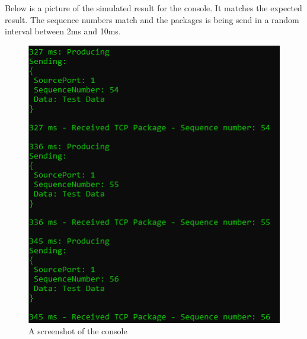 Below is a picture of the simulated result for the console. 
It matches the expected result. The sequence numbers match and the packages is being send in a random interval between 2ms and 10ms. 


\begin{figure}[H]
	\centering
	\includegraphics[width=\textwidth]{Images/ConsoleWindow3_3.png}
	\caption{A screenshot of the console}
	\label{fig:ConsoleWindow_3_3}
\end{figure}





